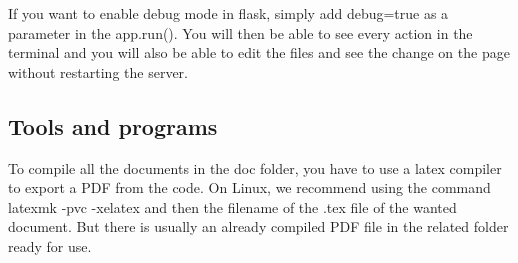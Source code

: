 \documentclass{TDP003mall}
\begin{document}
If you want to enable debug mode in flask, simply add debug=true as a parameter in the app.run(). You will then be able to see every action in the terminal and you will also be able to edit the files and see the change on the page without restarting the server.

\subsection{Tools and programs}
To compile all the documents in the doc folder, you have to use a latex compiler to export a PDF from the code. On Linux, we recommend using the command latexmk -pvc -xelatex and then the filename of the .tex file of the wanted document. But there is usually an already compiled PDF file in the related folder ready for use.
\end{document}

